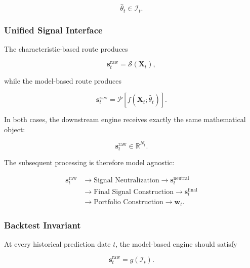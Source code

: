 \documentclass[11pt,a4paper]{article}
\begin{document}
\begin{equation}
\boxed{
\widehat{\theta}_t
\in
\mathcal{I}_t.
}
\end{equation}


\subsubsection{Unified Signal Interface}

The characteristic-based route produces

\begin{equation}
\mathbf{s}_t^{\mathrm{raw}}
=
\mathcal{S}
\left(
\mathbf{X}_t
\right),
\end{equation}

while the model-based route produces

\begin{equation}
\mathbf{s}_t^{\mathrm{raw}}
=
\mathcal{P}
\left[
f
\left(
\mathbf{X}_t;
\widehat{\theta}_t
\right)
\right].
\end{equation}

In both cases, the downstream engine receives exactly the same mathematical
object:

\begin{equation}
\boxed{
\mathbf{s}_t^{\mathrm{raw}}
\in
\mathbb{R}^{N_t}.
}
\end{equation}

The subsequent processing is therefore model agnostic:

\begin{equation}
\boxed{
\begin{aligned}
\mathbf{s}_t^{\mathrm{raw}}
&\rightarrow
\text{Signal Neutralization}
\rightarrow
\mathbf{s}_t^{\mathrm{neutral}}
\\[0.1cm]
&\rightarrow
\text{Final Signal Construction}
\rightarrow
\mathbf{s}_t^{\mathrm{final}}
\\[0.1cm]
&\rightarrow
\text{Portfolio Construction}
\rightarrow
\mathbf{w}_t.
\end{aligned}
}
\end{equation}


\subsubsection{Backtest Invariant}

At every historical prediction date $t$, the model-based engine should satisfy

\begin{equation}
\boxed{
\mathbf{s}_t^{\mathrm{raw}}
=
g
\left(
\mathcal{I}_t
\right).
}
\end{equation}
\end{document}
